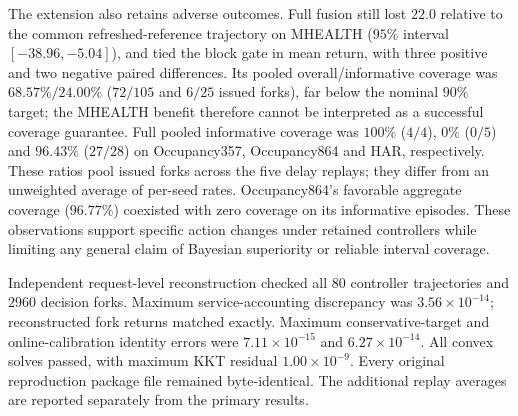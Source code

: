 The extension also retains adverse outcomes. Full fusion still lost $22.0$
relative to the common refreshed-reference trajectory on MHEALTH
($95\%$ interval $[-38.96,-5.04]$), and tied the block gate in mean return,
with three positive and two negative paired differences.
Its pooled overall/informative coverage was $68.57\%/24.00\%$
($72/105$ and $6/25$ issued forks), far below the nominal
$90\%$ target; the MHEALTH benefit therefore cannot be interpreted as a
successful coverage guarantee. Full pooled informative coverage was $100\%$
($4/4$), $0\%$ ($0/5$) and $96.43\%$ ($27/28$) on Occupancy357,
Occupancy864 and HAR, respectively. These ratios pool issued forks across
the five delay replays; they differ from an unweighted average of per-seed rates.
Occupancy864's favorable aggregate coverage ($96.77\%$) coexisted with zero
coverage on its informative episodes. These observations support specific
action changes under retained controllers while limiting any general claim
of Bayesian superiority or reliable interval coverage.

Independent request-level reconstruction checked all $80$ controller
trajectories and $2960$ decision forks. Maximum service-accounting discrepancy
was $3.56\times10^{-14}$; reconstructed fork returns matched exactly.
Maximum conservative-target and online-calibration identity errors were
$7.11\times10^{-15}$ and $6.27\times10^{-14}$. All convex solves passed,
with maximum KKT residual $1.00\times10^{-9}$. Every original reproduction
package file remained byte-identical. The additional replay averages are
reported separately from the primary results.
